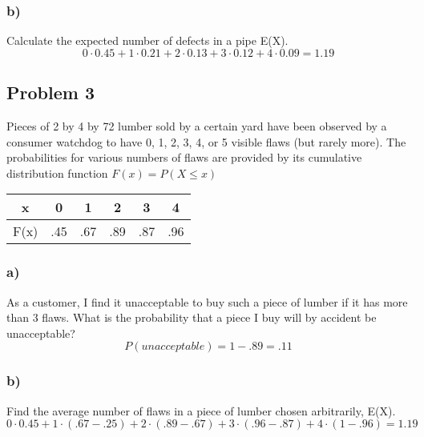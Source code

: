 \documentclass{article}
\begin{document}
\subsubsection*{b)}
Calculate the expected number of defects in a pipe E(X).
\begin{equation}
0 \cdot 0.45 + 1 \cdot 0.21 + 2 \cdot 0.13 + 3\cdot 0.12+ 4\cdot0.09 = 1.19
\end{equation}
\subsection*{Problem 3}
Pieces of 2 by 4 by 72 lumber sold by a certain yard have been observed by a consumer watchdog to have 0, 1, 2, 3, 4, or 5 visible flaws (but rarely more). The probabilities for various numbers of flaws are provided by its cumulative distribution function $F(x) = P(X \leq x)$
\begin{center}
    \begin{tabular}{c|c|c|c|c|c}
         x &  0 & 1 & 2 & 3 & 4\\
         \hline
         F(x) & .45 & .67 & .89 & .87 & .96\\
    \end{tabular}
\end{center}
\subsubsection*{a)}
As a customer, I find it unacceptable to buy such a piece of lumber if it has more than 3 flaws. What is the probability that a piece I buy will by accident be unacceptable?
\begin{equation}
    P(unacceptable) = 1 - .89 = .11
\end{equation}
\subsubsection*{b)}
Find the average number of flaws in a piece of lumber chosen arbitrarily, E(X). 
\begin{equation}
    0 \cdot 0.45 + 1 \cdot (.67 -.25) + 2 \cdot (.89-.67) + 3\cdot (.96-.87)+ 4\cdot(1 - .96) = 1.19
\end{equation}
\end{document}
